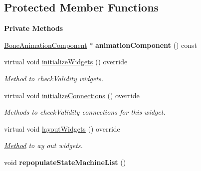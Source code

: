 \subsection*{Protected Member Functions}
\begin{Indent}\textbf{ Private Methods}\par
\begin{DoxyCompactItemize}
\item 
\mbox{\label{classrev_1_1_view_1_1_animation_component_widget_af461e2f5787e78aecd97f74c326c0d67}} 
\mbox{\hyperlink{classrev_1_1_bone_animation_component}{Bone\+Animation\+Component}} $\ast$ {\bfseries animation\+Component} () const
\item 
\mbox{\label{classrev_1_1_view_1_1_animation_component_widget_ac07c3e8ffbd7c5937c1a606cea4c0bc8}} 
virtual void \mbox{\hyperlink{classrev_1_1_view_1_1_animation_component_widget_ac07c3e8ffbd7c5937c1a606cea4c0bc8}{initialize\+Widgets}} () override
\begin{DoxyCompactList}\small\item\em \mbox{\hyperlink{struct_method}{Method}} to check\+Validity widgets. \end{DoxyCompactList}\item 
\mbox{\label{classrev_1_1_view_1_1_animation_component_widget_a8cd3927485e1ae7fa3a2b7970dac4989}} 
virtual void \mbox{\hyperlink{classrev_1_1_view_1_1_animation_component_widget_a8cd3927485e1ae7fa3a2b7970dac4989}{initialize\+Connections}} () override
\begin{DoxyCompactList}\small\item\em Methods to check\+Validity connections for this widget. \end{DoxyCompactList}\item 
\mbox{\label{classrev_1_1_view_1_1_animation_component_widget_aa41cfb47f8cdfe28bdc6b64d8cf21f99}} 
virtual void \mbox{\hyperlink{classrev_1_1_view_1_1_animation_component_widget_aa41cfb47f8cdfe28bdc6b64d8cf21f99}{layout\+Widgets}} () override
\begin{DoxyCompactList}\small\item\em \mbox{\hyperlink{struct_method}{Method}} to ay out widgets. \end{DoxyCompactList}\item 
\mbox{\label{classrev_1_1_view_1_1_animation_component_widget_adf14eb9b78a20b9e522ee9e490b7cc2f}} 
void {\bfseries repopulate\+State\+Machine\+List} ()
\end{DoxyCompactItemize}
\end{Indent}
